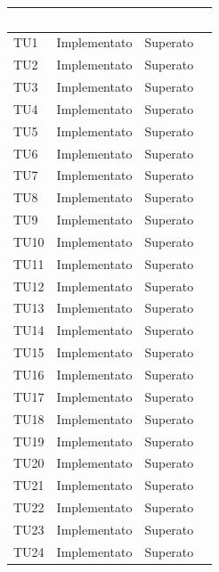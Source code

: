 \begin{longtable}{|>{\centering\arraybackslash}m{1.6cm}|>{\centering\arraybackslash}m{6.41cm}|>{\centering\arraybackslash}m{3.1cm}| c |}		
	\rowcolor{LightBlue}
	\textbf{\textcolor{white}{Test}}
	& \textbf{\textcolor{white}{Stato}}
	& \textbf{\textcolor{white}{Esito}}\\
	\hline
	\rowcolor{LightGray}
	TU1 & Implementato & Superato \\ \hline
	TU2 & Implementato & Superato  \\ \hline
		\rowcolor{LightGray}
	TU3 & Implementato & Superato  \\ \hline
	TU4 & Implementato & Superato  \\ \hline
		\rowcolor{LightGray}
	TU5 & Implementato & Superato  \\ \hline
	TU6 & Implementato & Superato  \\ \hline
		\rowcolor{LightGray}
	TU7 & Implementato & Superato  \\ \hline
	TU8 & Implementato & Superato  \\ \hline
		\rowcolor{LightGray}
	TU9 & Implementato & Superato  \\ \hline
	TU10 & Implementato & Superato  \\ \hline
		\rowcolor{LightGray}
	TU11 & Implementato & Superato  \\ \hline		
	TU12 & Implementato & Superato  \\ \hline
		\rowcolor{LightGray}
	TU13 & Implementato & Superato  \\ \hline
	TU14 & Implementato & Superato \\ \hline
		\rowcolor{LightGray}
	TU15 & Implementato & Superato  \\ \hline
	TU16 & Implementato & Superato \\ \hline
		\rowcolor{LightGray}
	TU17 & Implementato & Superato \\ \hline
	TU18 & Implementato & Superato \\ \hline
		\rowcolor{LightGray}
	TU19 & Implementato & Superato \\ \hline
	TU20 & Implementato & Superato \\ \hline
		\rowcolor{LightGray}
	TU21 & Implementato & Superato \\ \hline
	TU22 & Implementato & Superato \\ \hline
		\rowcolor{LightGray}
	TU23 & Implementato & Superato \\ \hline
	TU24 & Implementato & Superato \\ \hline

\end{longtable}
